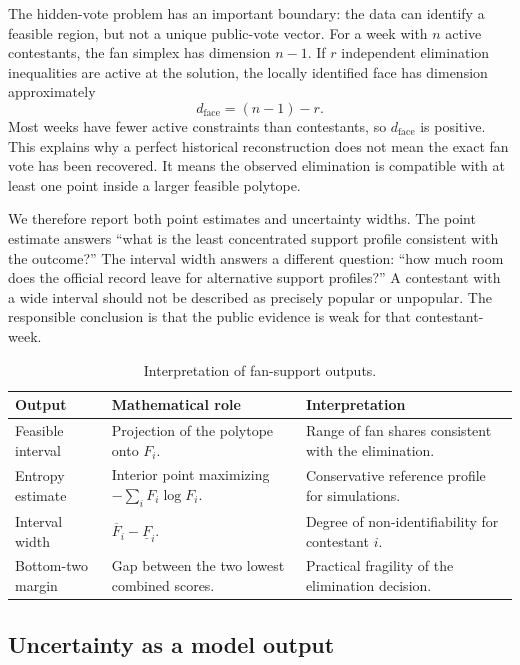 \documentclass[12pt]{article}
\begin{document}
The hidden-vote problem has an important boundary: the data can identify a
feasible region, but not a unique public-vote vector. For a week with $n$
active contestants, the fan simplex has dimension $n-1$. If $r$ independent
elimination inequalities are active at the solution, the locally identified
face has dimension approximately
\[
  d_{\mathrm{face}}=(n-1)-r .
\]
Most weeks have fewer active constraints than contestants, so $d_{\mathrm{face}}$
is positive. This explains why a perfect historical reconstruction does not
mean the exact fan vote has been recovered. It means the observed elimination
is compatible with at least one point inside a larger feasible polytope.

We therefore report both point estimates and uncertainty widths. The point
estimate answers ``what is the least concentrated support profile consistent
with the outcome?'' The interval width answers a different question: ``how much
room does the official record leave for alternative support profiles?'' A
contestant with a wide interval should not be described as precisely popular
or unpopular. The responsible conclusion is that the public evidence is weak
for that contestant-week.

\begin{table}[!htbp]
  \centering
  \caption{Interpretation of fan-support outputs.}
  \label{tab:identifiability}
  \begin{tabularx}{0.96\linewidth}{lXX}
    \toprule
    Output & Mathematical role & Interpretation \\
    \midrule
    Feasible interval & Projection of the polytope onto $F_i$. & Range of fan
    shares consistent with the elimination. \\
    Entropy estimate & Interior point maximizing $-\sum_iF_i\log F_i$. &
    Conservative reference profile for simulations. \\
    Interval width & $\overline F_i-\underline F_i$. & Degree of
    non-identifiability for contestant $i$. \\
    Bottom-two margin & Gap between the two lowest combined scores. & Practical
    fragility of the elimination decision. \\
    \bottomrule
  \end{tabularx}
\end{table}

\subsection{Uncertainty as a model output}
\end{document}
